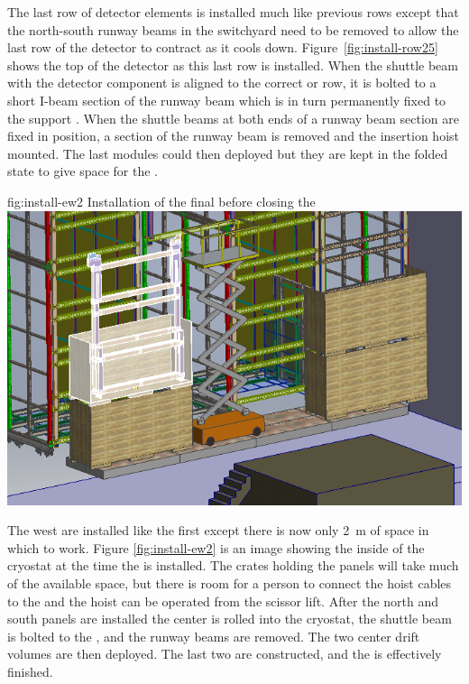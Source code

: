 The last row of detector elements is installed much like previous rows except that the north-south runway beams in the switchyard need to be removed to allow the last row of the detector to contract as it cools down.  Figure~\ref{fig:install-row25} shows the top of the detector as this last row is installed. When the shuttle beam with the detector component is aligned to the correct  or  row, it is bolted to a short I-beam section of the runway beam which is in turn permanently fixed to the  support \fdth . When the shuttle beams at both ends of a runway beam section are fixed in position, a section of the runway beam is removed and the  insertion hoist mounted. The last  modules could then deployed but they are kept in the folded state to give space for the . 



\begin{dunefigure}{fig:install-ew2}
  {Installation of the final  before closing the }
\includegraphics[width=.9\textwidth]{graphics/install-ew2.png}
\end{dunefigure}

The west  are installed like the first  except there is now only \SI{2}{m} of space in which to work. Figure \ref{fig:install-ew2} is an image showing the inside of the cryostat at the time the  is installed. The crates holding the  panels will take much of the available space, but there is room for a person to connect the hoist cables to the  and the hoist can be operated from the scissor lift. After the north and south  panels are installed the center  is rolled into the cryostat, the shuttle beam is bolted to the , and the runway beams are removed. The two center drift volumes  are then deployed. The last two  are constructed, and the  is effectively finished. 


